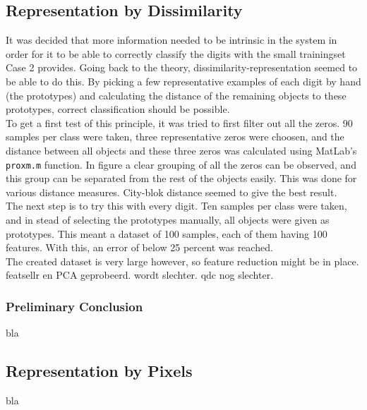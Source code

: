\subsection{Representation by Dissimilarity}
It was decided that more information needed to be intrinsic in the system in order for it to be able to correctly classify the digits with the small trainingset Case 2 provides. Going back to the theory, dissimilarity-representation seemed to be able to do this. By picking a few representative examples of each digit by hand (the prototypes) and calculating the distance of the remaining objects to these prototypes, correct classification should be possible. \\
\noindent To get a first test of this principle, it was tried to first filter out all the zeros. 90 samples per class were taken, three representative zeros were choosen, and the distance between all objects and these three zeros was calculated using MatLab's \texttt{proxm.m} function. In figure  a clear grouping of all the zeros can be observed, and this group can be separated from the rest of the objects easily. This was done for various distance measures. City-blok distance seemed to give the best result.  \\
\noindent The next step is to try this with every digit. Ten samples per class were taken, and in stead of selecting the prototypes manually, all objects were given as prototypes. This meant a dataset of 100 samples, each of them having 100 features. With this, an error of below 25 percent was reached.  \\
\noindent The created dataset is very large however, so feature reduction might be in place. 
featsellr en PCA geprobeerd. wordt slechter. qdc nog slechter. 

\subsubsection*{Preliminary Conclusion}
bla

\subsection{Representation by Pixels}
bla


